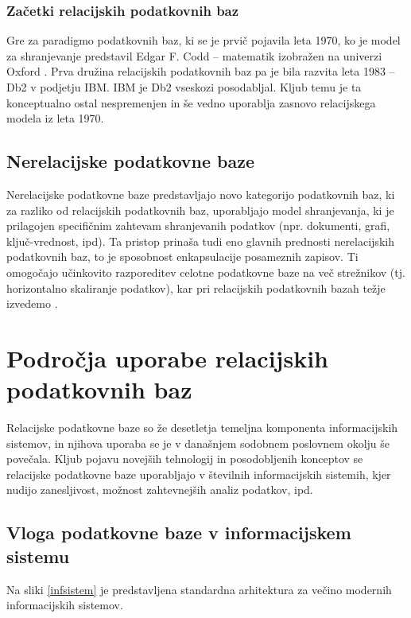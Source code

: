 \documentclass[a4paper,12pt,openright]{book}
\begin{document}
        \subsubsection{Začetki relacijskih podatkovnih baz}
        Gre za paradigmo podatkovnih baz, ki se je prvič pojavila leta 1970, ko je model za shranjevanje predstavil Edgar F. Codd – matematik izobražen na univerzi Oxford \cite{IBM_SUPB_1970}. Prva družina relacijskih podatkovnih baz pa je bila razvita leta 1983 – Db2 \cite{DB2} v podjetju IBM. IBM je Db2 vseskozi posodabljal. Kljub temu je ta konceptualno ostal nespremenjen in še vedno uporablja zasnovo relacijskega modela iz leta 1970.
        
        \subsection{Nerelacijske podatkovne baze}
        Nerelacijske podatkovne baze predstavljajo novo kategorijo podatkovnih baz, ki za razliko od relacijskih podatkovnih baz,  uporabljajo model shranjevanja, ki je prilagojen specifičnim zahtevam shranjevanih podatkov (npr. dokumenti, grafi, ključ-vrednost, ipd). Ta pristop prinaša tudi eno glavnih prednosti nerelacijskih podatkovnih baz, to je sposobnost enkapsulacije posameznih zapisov. Ti omogočajo učinkovito razporeditev celotne podatkovne baze na več strežnikov (tj. horizontalno skaliranje podatkov), kar pri relacijskih podatkovnih bazah težje izvedemo \cite{pokorny2011nosql}.
    
    \section{Področja uporabe relacijskih podatkovnih baz}

    Relacijske podatkovne baze so že desetletja temeljna komponenta informacijskih sistemov, in njihova uporaba se je v današnjem sodobnem poslovnem okolju še povečala. Kljub pojavu novejših tehnologij in posodobljenih konceptov se relacijske podatkovne baze uporabljajo v številnih informacijskih sistemih, kjer nudijo zanesljivost, možnost zahtevnejših analiz podatkov, ipd.

    \subsection{Vloga podatkovne baze v informacijskem sistemu}

    Na sliki \ref{infsistem} je predstavljena standardna arhitektura za večino modernih informacijskih sistemov.
\end{document}
